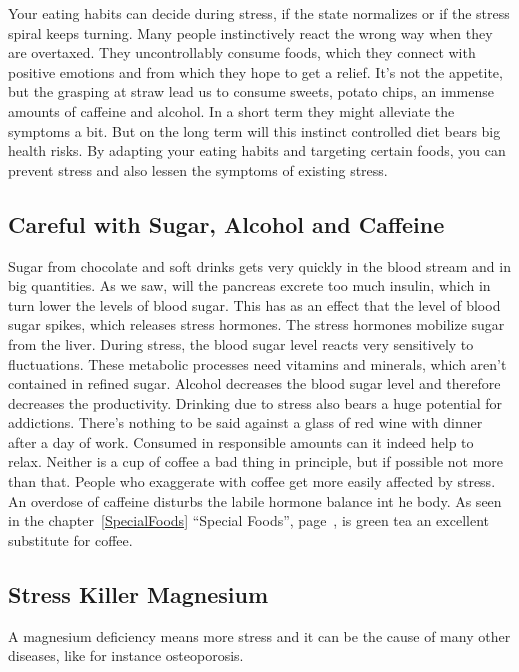 \documentclass[../main.tex]{subfiles}
\begin{document}
Your eating habits can decide during stress, if the state normalizes or if the stress spiral keeps turning.
Many people instinctively react the wrong way when they are overtaxed.
They uncontrollably consume foods, which they connect with positive emotions and from which they hope to get a relief.
It's not the appetite, but the grasping at straw lead us to consume sweets, potato chips, an immense amounts of caffeine and alcohol.
In a short term they might alleviate the symptoms a bit.
But on the long term will this instinct controlled diet bears big health risks.
By adapting your eating habits and targeting certain foods, you can prevent stress and also lessen the symptoms of existing stress.

\subsection{Careful with Sugar, Alcohol and Caffeine}

Sugar from chocolate and soft drinks gets very quickly in the blood stream and in big quantities.
As we saw, will the pancreas excrete too much insulin, which in turn lower the levels of blood sugar.
This has as an effect that the level of blood sugar spikes, which releases stress hormones.
The stress hormones mobilize sugar from the liver.
During stress, the blood sugar level reacts very sensitively to fluctuations.
These metabolic processes need vitamins and minerals, which aren't contained in refined sugar.
Alcohol decreases the blood sugar level and therefore decreases the productivity.
Drinking due to stress also bears a huge potential for addictions.
There's nothing to be said against a glass of red wine with dinner after a day of work.
Consumed in responsible amounts can it indeed help to relax.
Neither is a cup of coffee a bad thing in principle, but if possible not more than that.
People who exaggerate with coffee get more easily affected by stress.
An overdose of caffeine disturbs the labile hormone balance int he body.
As seen in the chapter~\ref{SpecialFoods} ``Special Foods'', page~\pageref{SpecialFoods}, is green tea
an excellent substitute for coffee.

\subsection{Stress Killer Magnesium}
 
A magnesium deficiency means more stress and it can be the cause of many other diseases,
like for instance osteoporosis.
\end{document}
